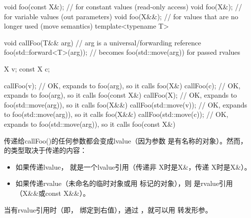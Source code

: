 \begin{cppcode}
void foo(const X&); // for constant values (read-only access)
void foo(X&); // for variable values (out parameters)
void foo(X&&); // for values that are no longer used (move semantics)
template<typename T>

void callFoo(T&& arg) { // arg is a universal/forwarding reference
	foo(std::forward<T>(arg)); // becomes foo(std::move(arg)) for passed rvalues
}

X v;
const X c;

callFoo(v); // OK, expands to foo(arg), so it calls foo(X&)
callFoo(c); // OK, expands to foo(arg), so it calls foo(const X&)
callFoo(X{}); // OK, expands to foo(std::move(arg)), so it calls foo(X&&)
callFoo(std::move(v)); // OK, expands to foo(std::move(arg)), so it calls foo(X&&)
callFoo(std::move(c)); // OK, expands to foo(std::move(arg)), so it calls foo(const X&)
\end{cppcode}

传递给callFoo()的任何参数都会变成lvalue（因为参数  是有名称的对象）。然而， 的类型取决于传递的内容：

\begin{itemize}
	\item 如果传递lvalue， 就是一个lvalue引用（传递非  X时是X\&，传递  X时是X\&）。
	\item 如果传递rvalue（未命名的临时对象或用  标记的对象），则  是rvalue引用（X\&\&或const X\&\&）。
\end{itemize}

当有rvalue引用时（即， 绑定到右值），通过 ，就可以用  转发形参。




















